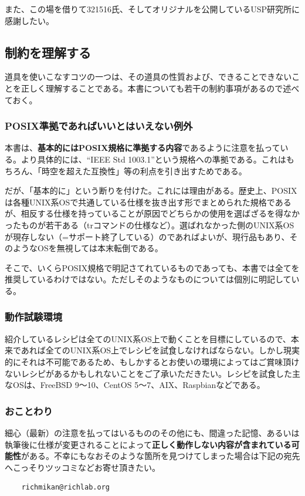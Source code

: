 また、この場を借りて321516氏、そしてオリジナルを公開しているUSP研究所に感謝したい。

\subsection*{制約を理解する}

道具を使いこなすコツの一つは、その道具の性質および、できることできないことを正しく理解することである。本書についても若干の制約事項があるので述べておく。

\subsubsection*{POSIX準拠であればいいとはいえない例外}

本書は、\textbf{基本的にはPOSIX規格に準拠する内容}であるように注意を払っている。より具体的には、``IEEE Std 1003.1''という規格への準拠である。これはもちろん、「時空を超えた互換性」等の利点を引き出すためである。

だが、「基本的に」という断りを付けた。これには理由がある。歴史上、POSIXは各種UNIX系OSで共通している仕様を抜き出す形でまとめられた規格であるが、相反する仕様を持っていることが原因でどちらかの使用を選ばざるを得なかったものが若干ある（trコマンドの仕様など）。選ばれなかった側のUNIX系OSが現存しない（=サポート終了している）のであればよいが、現行品もあり、そのようなOSを無視しては本末転倒である。

そこで、いくらPOSIX規格で明記さてれているものであっても、本書では全てを推奨しているわけではない。ただしそのようなものについては個別に明記している。

\subsubsection*{動作試験環境}

紹介しているレシピは全てのUNIX系OS上で動くことを目標にしているので、本来であれば全てのUNIX系OS上でレシピを試食しなければならない。しかし現実的にそれは不可能であるため、もしかするとお使いの環境によってはご賞味頂けないレシピがあるかもしれないことをご了承いただきたい。レシピを試食した主なOSは、FreeBSD 9～10、CentOS 5～7、AIX、Raspbianなどである。


\subsubsection*{おことわり}

細心（最新）の注意を払ってはいるもののその他にも、間違った記憶、あるいは執筆後に仕様が変更されることによって\textbf{正しく動作しない内容が含まれている可能性}がある。不幸にもなおそのような箇所を見つけてしまった場合は下記の宛先へこっそりツッコミなどお寄せ頂きたい。
\begin{verbatim}
	richmikan@richlab.org
\end{verbatim}
